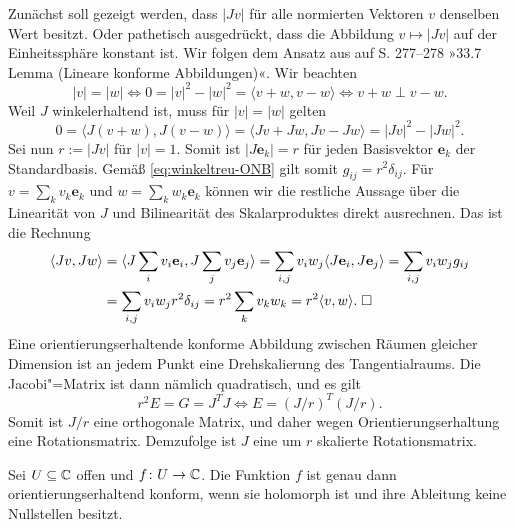 \noindent{}
Zunächst soll gezeigt werden, dass $|Jv|$ für alle normierten
Vektoren $v$ denselben Wert besitzt. Oder pathetisch ausgedrückt,
dass die Abbildung $v\mapsto |Jv|$ auf der Einheitssphäre konstant ist.
Wir folgen dem Ansatz aus \cite{Kriegl} auf S. 277--278
»33.7 Lemma (Lineare konforme Abbildungen)«. Wir beachten%
\begin{equation}
|v| = |w| \iff 0 = |v|^2 - |w|^2 = \langle v+w,v-w\rangle \iff v+w\perp v-w.
\end{equation}
Weil $J$ winkelerhaltend ist, muss für $|v|=|w|$ gelten%
\begin{equation}
0 = \langle J(v+w), J(v-w)\rangle = \langle Jv+Jw,Jv-Jw\rangle
= |Jv|^2-|Jw|^2.
\end{equation}
Sei nun $r:=|Jv|$ für $|v|=1$. Somit ist $|J\mathbf e_k|=r$
für jeden Basisvektor $\mathbf e_k$ der Standardbasis. Gemäß
\eqref{eq:winkeltreu-ONB} gilt somit $g_{ij} = r^2\delta_{ij}$.
Für $v = \sum_k v_k \mathbf e_k$ und $w = \sum_k w_k\mathbf e_k$
können wir die restliche Aussage über die Linearität von $J$
und Bilinearität des Skalarproduktes direkt ausrechnen. Das ist die
Rechnung
\begin{align*}
\langle Jv,Jw\rangle &= \langle J\sum_i v_i\mathbf e_i,J\sum_j v_j\mathbf e_j\rangle
= \sum_{i,j} v_i w_j\langle J\mathbf e_i,J\mathbf e_j\rangle
= \sum_{i,j} v_i w_j g_{ij}\\
&= \sum_{i,j} v_i w_j r^2 \delta_{ij}
= r^2\sum_k v_k w_k = r^2\langle v,w\rangle.\;\Box
\end{align*}
Eine orientierungserhaltende konforme Abbildung zwischen Räumen
gleicher Dimension ist an jedem Punkt eine
Drehskalierung des
Tangentialraums. Die Jacobi"=Matrix ist dann nämlich quadratisch,
und es gilt
\begin{equation}
r^2 E = G = J^T J \iff E = (J/r)^T(J/r).
\end{equation}
Somit ist $J/r$ eine orthogonale Matrix, und daher wegen
Orientierungserhaltung eine Rotationsmatrix. Demzufolge ist $J$ eine
um $r$ skalierte Rotationsmatrix.

\begin{corollary}
Sei $U\subseteq\mathbb C$ offen und $f\colon U\to\mathbb C$. Die Funktion
$f$ ist genau dann orientierungserhaltend konform, wenn sie holomorph
ist und ihre Ableitung keine Nullstellen besitzt.
\end{corollary}

